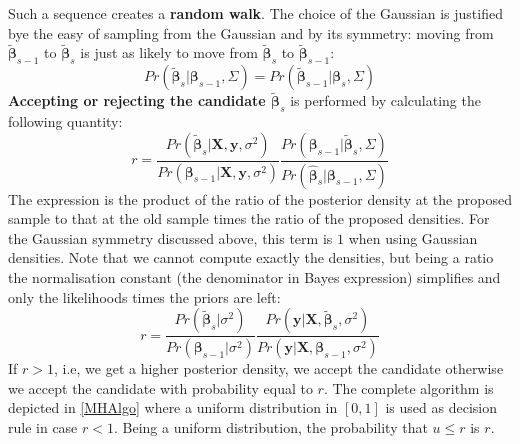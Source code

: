 \documentclass[12pt, letterpaper]{article}
\theoremstyle{definition}
\newcommand{\X}{\mathrm{\mathbf{X}}}
\newcommand{\y}{\mathbf{y}}
\newcommand{\be}{\mathbf{\beta}}
\newcommand{\ssq}{\sigma^2}
\begin{document}
Such a sequence creates a \textbf{random walk}. The choice of the Gaussian is justified bye the easy of sampling from the Gaussian and by its symmetry: moving from $\tilde{\be}_{s-1}$ to $\tilde{\be}_s$ is just as likely to move from $\tilde{\be}_s$ to $\tilde{\be}_{s-1}$:
\begin{equation}
Pr(\tilde{\be}_s|\be_{s-1}, \Sigma)  = Pr(\tilde{\be}_{s-1}|\be_{s}, \Sigma) 
\end{equation}
\textbf{Accepting or rejecting the candidate $\tilde{\be}_s$} is performed by calculating the following quantity:
\begin{equation}
r = \frac{Pr(\tilde{\be}_s|\X, \y, \ssq)}{Pr(\be_{s-1}|\X, \y, \ssq)}\frac{Pr(\be_{s-1}|\tilde{\be}_s, \Sigma)}{Pr(\hat{\be}_{s}|\be_{s-1}, \Sigma)}
\end{equation}
The expression is the product of the ratio of the posterior density at the proposed sample to that at the old sample times the ratio of the proposed densities. For the Gaussian symmetry discussed above, this term is $1$ when using Gaussian densities. Note that we cannot compute exactly the densities, but being a ratio the normalisation constant (the denominator in Bayes expression) simplifies and only the likelihoods times the priors are left:
\begin{equation}
r = \frac{Pr(\tilde{\be}_s|\ssq)}{Pr(\be_{s-1}| \ssq)} \frac{Pr(\y|\X, \tilde{\be}_s, \ssq)}{Pr(\y|\X, \be_{s-1}, \ssq)}
\end{equation}
If $r>1$, i.e, we get a higher posterior density, we accept the candidate otherwise we accept the candidate with probability equal to $r$. The complete algorithm is depicted in \autoref{MHAlgo} where a uniform distribution in $[0,1]$ is used as decision rule in case $r<1$. Being a uniform distribution, the probability that $u \le r$ is $r$.
\end{document}
